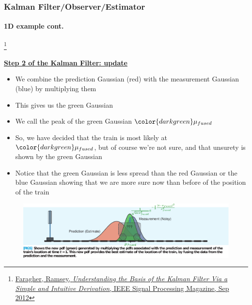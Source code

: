 \documentclass{beamer}
\newenvironment{changemargin}[2]
	{
	  	\begin{list}{}
		{
			\setlength{\topsep}{0pt}%
			\setlength{\leftmargin}{#1}%
			\setlength{\rightmargin}{#2}%
			\setlength{\listparindent}{\parindent}%
			\setlength{\itemindent}{\parindent}%
			\setlength{\parsep}{\parskip}%
		}
	  	\item[]
		}
		{\end{list}
	}
\begin{document}
\begin{frame}[plain]
\frametitle{Kalman Filter/Observer/Estimator}
\framesubtitle{1D example \tiny cont.}

\footnote{\tiny\hspace{-0.23in} \href{http://www.cl.cam.ac.uk/~rmf25/papers/Understanding the Basis of the Kalman Filter.pdf}{Faragher, Ramsey, \emph{Understanding the Basis of the Kalman Filter Via a Simple and Intuitive Derivation}, IEEE Signal Processing Magazine, Sep 2012}}
\scriptsize
\begin{changemargin}{-1.3in}{0in}
\underline{\textbf{Step 2 of the Kalman Filter: update}}
\begin{itemize}\scriptsize
\item We combine the prediction Gaussian (red) with the measurement Gaussian (blue) by multiplying them
\item This gives us the green Gaussian
\item We call the peak of the green Gaussian ${\color{darkgreen}\mu_{fused}}$
\item So, we have decided that the train is most likely at ${\color{darkgreen}\mu_{fused}}$, but of course we're not sure, and that unsurety is shown by the green Gaussian
\item Notice that the green Gaussian is less spread than the red Gaussian or the blue Gaussian showing that we are more sure now than before of the position of the train
\end{itemize}
\begin{figure}[h]
\centering
\includegraphics[width=1.35\textwidth]{figs/2012_MAG_Understanding_the_Basis_of_the_Kalman_Filter_fig5.pdf}
\end{figure}
\end{changemargin}
\end{frame}
\end{document}

